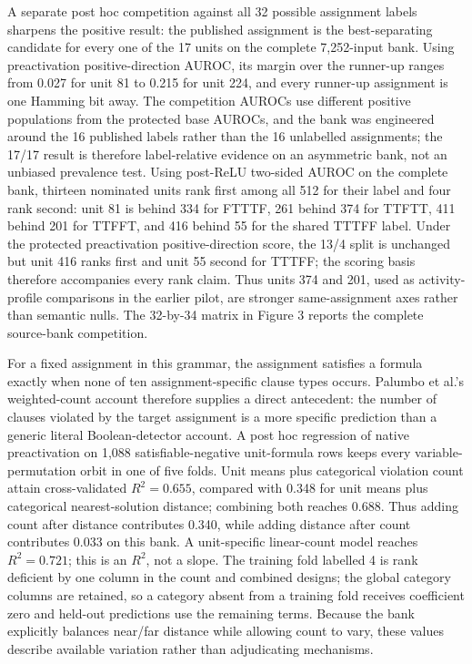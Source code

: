 \documentclass[
  british,
  11pt,
  a4paper,
]{article}
\newcounter{none} %
\begin{document}
A separate post hoc competition against all 32 possible assignment
labels sharpens the positive result: the published assignment is the
best-separating candidate for every one of the 17 units on the complete
7,252-input bank. Using preactivation positive-direction AUROC, its
margin over the runner-up ranges from 0.027 for unit 81 to 0.215 for
unit 224, and every runner-up assignment is one Hamming bit away. The
competition AUROCs use different positive populations from the protected
base AUROCs, and the bank was engineered around the 16 published labels
rather than the 16 unlabelled assignments; the 17/17 result is therefore
label-relative evidence on an asymmetric bank, not an unbiased
prevalence test. Using post-ReLU two-sided AUROC on the complete bank,
thirteen nominated units rank first among all 512 for their label and
four rank second: unit 81 is behind 334 for FTTTF, 261 behind 374 for
TTFTT, 411 behind 201 for TTFFT, and 416 behind 55 for the shared TTTFF
label. Under the protected preactivation positive-direction score, the
13/4 split is unchanged but unit 416 ranks first and unit 55 second for
TTTFF; the scoring basis therefore accompanies every rank claim. Thus
units 374 and 201, used as activity-profile comparisons in the earlier
pilot, are stronger same-assignment axes rather than semantic nulls. The
32-by-34 matrix in Figure 3 reports the complete source-bank
competition.

For a fixed assignment in this grammar, the assignment satisfies a
formula exactly when none of ten assignment-specific clause types
occurs. Palumbo et al.'s weighted-count account therefore supplies a
direct antecedent: the number of clauses violated by the target
assignment is a more specific prediction than a generic literal
Boolean-detector account. A post hoc regression of native preactivation
on 1,088 satisfiable-negative unit-formula rows keeps every
variable-permutation orbit in one of five folds. Unit means plus
categorical violation count attain cross-validated \(R^2=0.655\),
compared with 0.348 for unit means plus categorical nearest-solution
distance; combining both reaches 0.688. Thus adding count after distance
contributes 0.340, while adding distance after count contributes 0.033
on this bank. A unit-specific linear-count model reaches \(R^2=0.721\);
this is an \(R^2\), not a slope. The training fold labelled 4 is rank
deficient by one column in the count and combined designs; the global
category columns are retained, so a category absent from a training fold
receives coefficient zero and held-out predictions use the remaining
terms. Because the bank explicitly balances near/far distance while
allowing count to vary, these values describe available variation rather
than adjudicating mechanisms.
\end{document}
